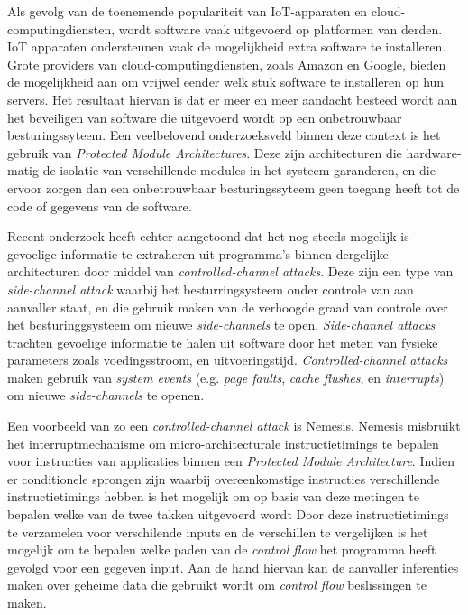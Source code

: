 \documentclass[master=cws,masteroption=ai, english]{kulemt}
\begin{document}
\begin{abstract*}
Als gevolg van de toenemende populariteit van IoT-apparaten en cloud-computingdiensten, wordt software vaak uitgevoerd op platformen van derden. 
IoT apparaten ondersteunen vaak de mogelijkheid extra software te installeren. Grote providers van cloud-computingdiensten, zoals Amazon en Google, bieden de mogelijkheid aan 
om vrijwel eender welk stuk software te installeren op hun servers. 
Het resultaat hiervan is dat er meer en meer aandacht besteed wordt aan het beveiligen van software die uitgevoerd wordt op een onbetrouwbaar besturingssyteem. 
Een veelbelovend onderzoeksveld binnen deze context is het gebruik van \textit{Protected Module Architectures}. 
Deze zijn architecturen die hardware-matig de isolatie van verschillende modules in het systeem garanderen, en die ervoor zorgen dan een onbetrouwbaar besturingssyteem geen toegang
heeft tot de code of gegevens van de software. 

Recent onderzoek heeft echter aangetoond dat het nog steeds mogelijk is gevoelige informatie te extraheren uit programma's binnen dergelijke architecturen door middel van \textit{controlled-channel attacks}. 
Deze zijn een type van \textit{side-channel attack} waarbij het besturringsysteem onder controle van aan aanvaller staat, en die gebruik maken van de verhoogde graad van controle over het besturinggsysteem om nieuwe \textit{side-channels} te open. 
\textit{Side-channel attacks} trachten gevoelige informatie te halen uit software door het meten van fysieke parameters zoals voedingsstroom, en uitvoeringstijd. 
\textit{Controlled-channel attacks} maken gebruik van \textit{system events} (e.g. \textit{page faults}, \textit{cache flushes}, en \textit{interrupts}) om nieuwe 
\textit{side-channels} te openen. 

Een voorbeeld van zo een \textit{controlled-channel attack} is Nemesis. Nemesis misbruikt het interruptmechanisme om micro-architecturale instructietimings te bepalen voor
instructies van applicaties binnen een \textit{Protected Module Architecture}. 
Indien er conditionele sprongen zijn waarbij overeenkomstige instructies verschillende instructietimings hebben is het mogelijk om op basis van deze metingen te bepalen welke van de twee takken uitgevoerd wordt
Door deze instructietimings te verzamelen voor verschilende inputs en de verschillen te vergelijken
is het mogelijk om te bepalen welke paden van de \textit{control flow} het programma heeft gevolgd voor een gegeven input. 
Aan de hand hiervan kan de aanvaller inferenties maken over geheime data die gebruikt wordt om \textit{control flow} beslissingen te maken. 


\end{abstract*}
\end{document}
